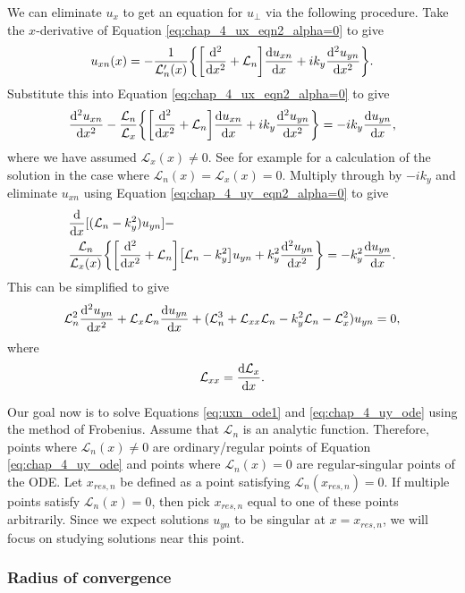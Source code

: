 We can eliminate $u_x$ to get an equation for $u_\perp$ via the following procedure. Take the $x$-derivative of Equation \eqref{eq:chap_4_ux_eqn2_alpha=0} to give
\[
    u_{xn}(x) = -\frac{1}{\mathcal{L}_n'(x)}\qty{\qty[\dv[2]{}{x}+\mathcal{L}_n]\dv{u_{xn}}{x}+ik_y\dv[2]{u_{yn}}{x}}.
\]
Substitute this into Equation \eqref{eq:chap_4_ux_eqn2_alpha=0} to give
\[
    \dv[2]{u_{xn}}{x}-\frac{\mathcal{L}_n}{\mathcal{L}_x}\qty{\qty[\dv[2]{}{x}+\mathcal{L}_n]\dv{u_{xn}}{x}+ik_y\dv[2]{u_{yn}}{x}}=-ik_y\dv{u_{yn}}{x},
\]
where we have assumed $\mathcal{L}_x(x)\ne0$. See for example \citet{Thompson1993} for a calculation of the solution in the case where $\mathcal{L}_n(x)=\mathcal{L}_x(x)=0$.
Multiply through by $-ik_y$ and eliminate $u_{xn}$ using Equation \eqref{eq:chap_4_uy_eqn2_alpha=0} to give
\[
\begin{aligned}
    &\dv{}{x}[(\mathcal{L}_n-k_y^2)u_{yn}]-\\
    &\frac{\mathcal{L}_n}{\mathcal{L}_x(x)}\qty{\qty[\dv[2]{}{x}+\mathcal{L}_n]\qty[\mathcal{L}_n-k_y^2]u_{yn}+k_y^2\dv[2]{u_{yn}}{x}}=-k_y^2\dv{u_{yn}}{x}.
\end{aligned}
\]
This can be simplified to give
\begin{equation}
\label{eq:chap_4_uy_ode}
    \mathcal{L}_n^2\dv[2]{u_{yn}}{x}+\mathcal{L}_x\mathcal{L}_n\dv{u_{yn}}{x}+(\mathcal{L}_n^3+\mathcal{L}_{xx}\mathcal{L}_n-k_y^2\mathcal{L}_n-\mathcal{L}_x^2) u_{yn}=0,
\end{equation}
where
\begin{equation}
    \mathcal{L}_{xx} = \dv{\mathcal{L}_x}{x}.
\end{equation}

Our goal now is to solve Equations \eqref{eq:uxn_ode1} and \eqref{eq:chap_4_uy_ode} using the method of Frobenius. Assume that $\mathcal{L}_n$ is an analytic function. Therefore, points where $\mathcal{L}_n(x)\ne0$ are ordinary/regular points of Equation \eqref{eq:chap_4_uy_ode} and points where $\mathcal{L}_n(x)=0$ are regular-singular points of the ODE. Let $x_{res,n}$ be defined as a point satisfying $\mathcal{L}_n(x_{res,n})=0$. If multiple points satisfy $\mathcal{L}_n(x)=0$, then pick $x_{res,n}$ equal to one of these points arbitrarily. Since we expect solutions $u_{yn}$ to be singular at $x=x_{res,n}$, we will focus on studying solutions near this point.

\subsubsection{Radius of convergence}

